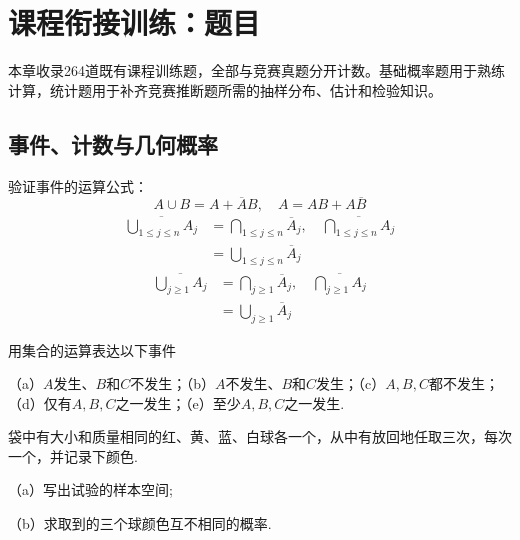 \setcounter{chapter}{3} %
\chapter{课程衔接训练：题目}
本章收录264道既有课程训练题，全部与竞赛真题分开计数。基础概率题用于熟练计算，统计题用于补齐竞赛推断题所需的抽样分布、估计和检验知识。


\clearpage\section{事件、计数与几何概率}

\begin{exercise}[事件分解与德摩根律]\label{q:Y1.1}
验证事件的运算公式：
\[
A\cup B=A+\overline{A}B,\quad A=AB+A\overline{B}
\]
\[\begin{aligned}\overline {\bigcup\limits_{1 \leqslant j \leqslant n} {{A_j}} }  &= \bigcap\limits_{1 \leqslant j \leqslant n} {{{\overline A }_j}},\quad  \overline {\bigcap\limits_{1 \leqslant j \leqslant n} {{A_j}} }  \\&= \bigcup\limits_{1 \leqslant j \leqslant n} {{{\overline A }_j}} \end{aligned}\]
\[\begin{aligned}\overline {\bigcup\limits_{j \geqslant 1} {{A_j}} }  &= \bigcap\limits_{j \geqslant 1} {{{\overline A }_j}},\quad  \overline {\bigcap\limits_{j \geqslant 1} {{A_j}} }  \\&= \bigcup\limits_{j \geqslant 1} {{{\overline A }_j}} \end{aligned}\]\par{}\end{exercise}

\begin{exercise}[用集合语言表示事件]\label{q:Y1.2}
用集合的运算表达以下事件

（a）$A$发生、$B$和$C$不发生；（b）$A$不发生、$B$和$C$发生；（c）$A,B,C$都不发生；（d）仅有$A,B,C$之一发生；（e）至少$A,B,C$之一发生.\par{}\end{exercise}

\begin{exercise}[有放回抽球与样本空间]\label{q:Y1.3}
袋中有大小和质量相同的红、黄、蓝、白球各一个，从中有放回地任取三次，每次一个，并记录下颜色.

（a）写出试验的样本空间;

（b）求取到的三个球颜色互不相同的概率.\par{}\end{exercise}

